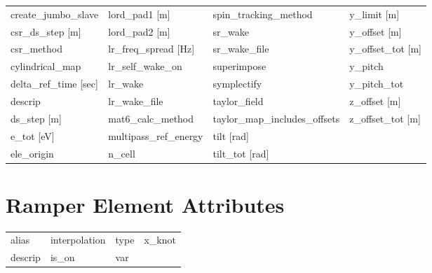 \begin{tabular}{llll}
create_jumbo_slave               & lord_pad1 [m]                    & spin_tracking_method             & y_limit [m]                      \\
csr_ds_step [m]                  & lord_pad2 [m]                    & sr_wake                          & y_offset [m]                     \\
csr_method                       & lr_freq_spread [Hz]              & sr_wake_file                     & y_offset_tot [m]                 \\
cylindrical_map                  & lr_self_wake_on                  & superimpose                      & y_pitch                          \\
delta_ref_time [sec]             & lr_wake                          & symplectify                      & y_pitch_tot                      \\
descrip                          & lr_wake_file                     & taylor_field                     & z_offset [m]                     \\
ds_step [m]                      & mat6_calc_method                 & taylor_map_includes_offsets      & z_offset_tot [m]                 \\
e_tot [eV]                       & multipass_ref_energy             & tilt [rad]                       &                                  \\
ele_origin                       & n_cell                           & tilt_tot [rad]                   &                                  \\
 \bottomrule
 \end{tabular}
 \vfill
 
 \section{Ramper Element Attributes}
 \label{s:list.ramper}
 
 \begin{tabular}{llll} \toprule
alias                            & interpolation                    & type                             & x_knot                           \\
descrip                          & is_on                            & var                              &                                  \\
 \bottomrule
 \end{tabular}
 \vfill
 
